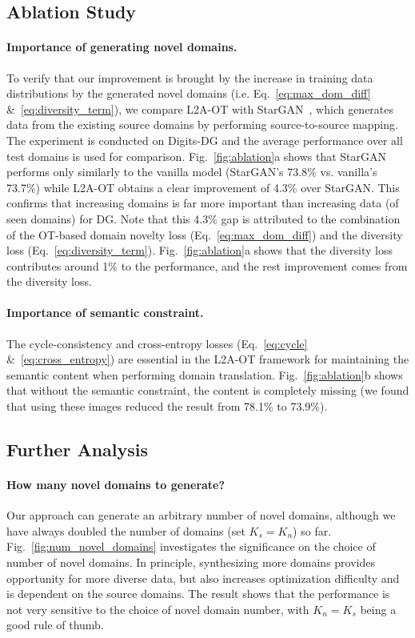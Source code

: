 \documentclass[runningheads]{llncs}
\begin{document}
\subsection{Ablation Study}

\paragraph{Importance of generating novel domains.}
To verify that our improvement is brought by the increase in training data distributions by the generated novel domains (i.e. Eq.~\eqref{eq:max_dom_diff} \&~\eqref{eq:diversity_term}), we compare L2A-OT with StarGAN~\cite{StarGAN}, which generates data from the existing source domains by performing source-to-source mapping. The experiment is conducted on Digits-DG and the average performance over all test domains is used for comparison. Fig.~\ref{fig:ablation}a shows that StarGAN performs only similarly to the vanilla model (StarGAN's 73.8\% vs. vanilla's 73.7\%) while L2A-OT obtains a clear improvement of 4.3\% over StarGAN. This confirms that increasing domains is far more important than increasing data (of seen domains) for DG. Note that this 4.3\% gap is attributed  to the combination of the OT-based domain novelty loss (Eq.~\eqref{eq:max_dom_diff}) and the diversity loss (Eq.~\eqref{eq:diversity_term}). 
Fig.~\ref{fig:ablation}a shows that the diversity loss  contributes around 1\% to the performance, and the rest improvement comes from the diversity loss.

\paragraph{Importance of semantic constraint.}
The cycle-consistency and cross-entropy losses (Eq.~\eqref{eq:cycle} \&~\eqref{eq:cross_entropy}) are essential in the L2A-OT framework for maintaining the semantic content when performing domain translation. Fig.~\ref{fig:ablation}b shows that without the semantic constraint, the content is completely missing (we found that using these images reduced the result from 78.1\% to 73.9\%).

\subsection{Further Analysis}

\paragraph{How many novel domains to generate?}
Our approach can generate an arbitrary number of novel domains, although we have always doubled the number of domains (set $K_s=K_n$) so far. Fig.~\ref{fig:num_novel_domains} investigates the significance on the choice of number of novel domains. In principle, synthesizing more domains provides opportunity for more diverse data, but also increases optimization difficulty and is dependent on the source domains. The result shows that the performance is not very sensitive to the choice of novel domain number, with $K_n=K_s$ being a good rule of thumb.
\end{document}
